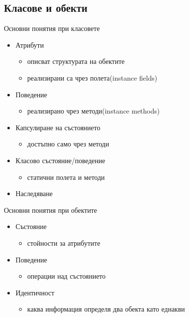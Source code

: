 \documentclass{beamer}
\begin{document}
\subsection{Класове и обекти}
\begin{frame}{Основни понятия при класовете}
  \transdissolve
  \begin{itemize}
  \item Атрибути
    \begin{itemize}
    \item описват структурата на обектите \pause
    \item реализирани са чрез полета(instance fields) \pause
    \end{itemize}
  \item Поведение \pause
    \begin{itemize}
    \item реализирано чрез методи(instance methods) \pause
    \end{itemize}
  \item Капсулиране на състоянието  \pause
    \begin{itemize}
    \item достъпно само чрез методи
    \end{itemize}
  \item Класово състояние/поведение \pause
    \begin{itemize}
    \item статични полета и методи \pause
    \end{itemize}
  \item Наследяване
  \end{itemize}
\end{frame}

\begin{frame}{Основни понятия при обектите}
  \transdissolve
  \begin{itemize}
  \item Състояние \pause
    \begin{itemize}
    \item стойности за атрибутите \pause
    \end{itemize}
  \item Поведение \pause
    \begin{itemize}
    \item операции над състоянието \pause
    \end{itemize}
  \item Идентичност \pause
    \begin{itemize}
    \item каква информация определя два обекта като еднакви
    \end{itemize}
  \end{itemize}
\end{frame}
\end{document}
